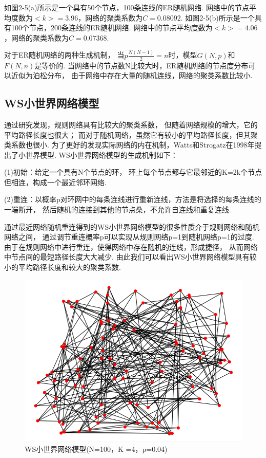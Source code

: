 \documentclass[bachelor,adobefonts]{jnuthesis}
\begin{document}

如图2-5(a)所示是一个具有50个节点，100条连线的ER随机网络.
网络中的节点平均度数为$<k> = 3.96$，网络的聚类系数为$C = 0.08092$.
如图2-5(b)所示是一个具有100个节点，200条连线的ER随机网络.
网络中的节点平均度数为$<k> = 4.06$，网络的聚类系数为$C = 0.07368$.


对于ER随机网络的两种生成机制，
当$p\frac{N(N-1)}{2} = n$时，模型$G(N,p)$和$F(N,n)$是等价的.
当网络中的节点数N比较大时，ER随机网络的节点度分布可以近似为泊松分布，
由于网络中存在大量的随机连线，网络的聚类系数比较小.

\subsection{WS小世界网络模型}
通过研究发现，规则网络具有比较大的聚类系数，
但随着网络规模的增大，它的平均路径长度也很大；
而对于随机网络，虽然它有较小的平均路径长度，但其聚类系数也很小.
为了更好的发现实际网络的内在机制，Watts和Strogatz在1998年提出了小世界模型.
WS小世界网络模型的生成机制如下：

(1)初始：给定一个具有N个节点的环，
环上每个节点都与它最邻近的K=2k个节点但相连，构成一个最近邻环网络.

(2)重连：以概率p对环网中的每条连线进行重新连线，方法是将选择的每条连线的一端断开，
然后随机的连接到其他的节点桑，不允许自连线和重复连线.

通过最近网络随机重连得到的WS小世界网络模型的很多性质介于规则网络和随机网络之间，
通过调节重连概率p可以实现从规则网络p=1到随机网络p=1的过度.
由于在规则网络中进行重连，使得网络中存在随机的连线，形成捷径，
从而网络中节点间的最短路径长度大大减少.
由此我们可以看出WS小世界网络模型具有较小的平均路径长度和较大的聚类系数.

\begin{figure}[h!]
  \centering
  \includegraphics[width=0.6\linewidth]{WWS.png}
  \caption{WS小世界网络模型(N=100，K =4，p=0.04)}
\end{figure}
\end{document}
